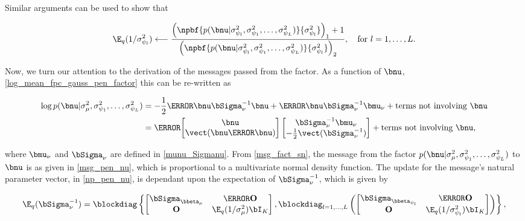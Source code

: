 \documentclass[12pt]{article}
\def\Sigmanu{\bSigma_{\nu}}
\def\munu{\bmu_{\nu}}
\def\sigsqmu{\sigma^2_{\mu}}
\def\betamu{\bbeta_\mu}
\newcommand\betapsi[1]{\bbeta_{\psi_{#1}}}
\newcommand\sigsqpsi[1]{\sigma^2_{\psi_{#1}}}
\newcommand\tni[1]{\text{terms not involving $#1$}}
\theoremstyle{plain}
\theoremstyle{definition}
\theoremstyle{remark}
\begin{document}
\noindent Similar arguments can be used to show that

\begin{equation}
	\E_q (1/\sigsqpsi{l})
		\longleftarrow
			\frac{
				\left( \npbf{p(\bnu | \sigsqpsi{l}, \sigsqpsi{1}, \dots, \sigsqpsi{L})}{\sigsqpsi{l}} \right)_1 + 1
			}{
				\left( \npbf{p(\bnu | \sigsqpsi{l}, \sigsqpsi{1}, \dots, \sigsqpsi{L})}{\sigsqpsi{l}} \right)_2
			}, \quad \text{for $l = 1, \dots, L$.}
\label{exp_pen_sigsqpsi}
\end{equation}

Now, we turn our attention to the derivation of the messages passed from the factor. As a function of $\bnu$,
\eqref{log_mean_fpc_gauss_pen_factor} this can be re-written as

\begin{align*}
	\log p(\bnu | \sigsqmu, \sigsqpsi{1}, \dots, \sigsqpsi{L})
		& = -\frac12 \T{\bnu} \Sigmanu^{-1} \bnu + \T{\bnu} \Sigmanu^{-1} \munu + \tni{\bnu} \\
		& = \T{\begin{bmatrix}
			\bnu \\
			\vect (\bnu \T{\bnu})
		\end{bmatrix}} \begin{bmatrix}
			\Sigmanu^{-1} \munu \\
			-\frac12 \vect (\Sigmanu^{-1})
		\end{bmatrix} + \tni{\bnu},
\end{align*}

\noindent where $\munu$ and $\Sigmanu$ are defined in \eqref{munu_Sigmanu}.
From \eqref{msg_fact_sn}, the message from the factor $p(\bnu | \sigsqmu, \sigsqpsi{1}, \dots, \sigsqpsi{L})$
to $\bnu$ is as given in \eqref{msg_pen_nu}, which is proportional to a multivariate normal density function.
The update for the message's natural parameter vector, in \eqref{np_pen_nu},
is dependant upon the expectation of $\Sigmanu^{-1}$, which is given by

\[
	\E_q (\Sigmanu^{-1}) =
		\blockdiag \left\{
			\begin{bmatrix}
				\bSigma_{\betamu} & \T{\textbf{O}} \\
				\textbf{O} & \E_q (1/\sigsqmu) \bI_K
			\end{bmatrix},
			\blockdiag_{l = 1, \dots, L} \left(
				\begin{bmatrix}
					\bSigma_{\betapsi{l}} & \T{\textbf{O}} \\
					\textbf{O} & \E_q (1/\sigsqpsi{l}) \bI_K
				\end{bmatrix}
			\right)
		\right\},
\]
\end{document}
